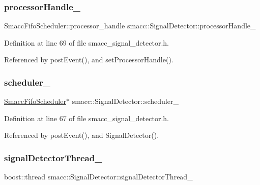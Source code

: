 \subsubsection{\texorpdfstring{processor\+Handle\+\_\+}{processorHandle\_}}
{\footnotesize\ttfamily Smacc\+Fifo\+Scheduler\+::processor\+\_\+handle smacc\+::\+Signal\+Detector\+::processor\+Handle\+\_\+\hspace{0.3cm}{\ttfamily [private]}}



Definition at line 69 of file smacc\+\_\+signal\+\_\+detector.\+h.



Referenced by post\+Event(), and set\+Processor\+Handle().

\mbox{\label{classsmacc_1_1SignalDetector_adaee5b9b91d0e6305dc1ab30f7ab566d}} 
\subsubsection{\texorpdfstring{scheduler\+\_\+}{scheduler\_}}
{\footnotesize\ttfamily \hyperlink{smacc__fifo__scheduler_8h_a0063e275231c80d5f97df21d17257bf7}{Smacc\+Fifo\+Scheduler}$\ast$ smacc\+::\+Signal\+Detector\+::scheduler\+\_\+\hspace{0.3cm}{\ttfamily [private]}}



Definition at line 67 of file smacc\+\_\+signal\+\_\+detector.\+h.



Referenced by post\+Event(), and Signal\+Detector().

\mbox{\label{classsmacc_1_1SignalDetector_a4346a400cd37eafc5d1d2e63d975785e}} 
\subsubsection{\texorpdfstring{signal\+Detector\+Thread\+\_\+}{signalDetectorThread\_}}
{\footnotesize\ttfamily boost\+::thread smacc\+::\+Signal\+Detector\+::signal\+Detector\+Thread\+\_\+\hspace{0.3cm}{\ttfamily [private]}}



